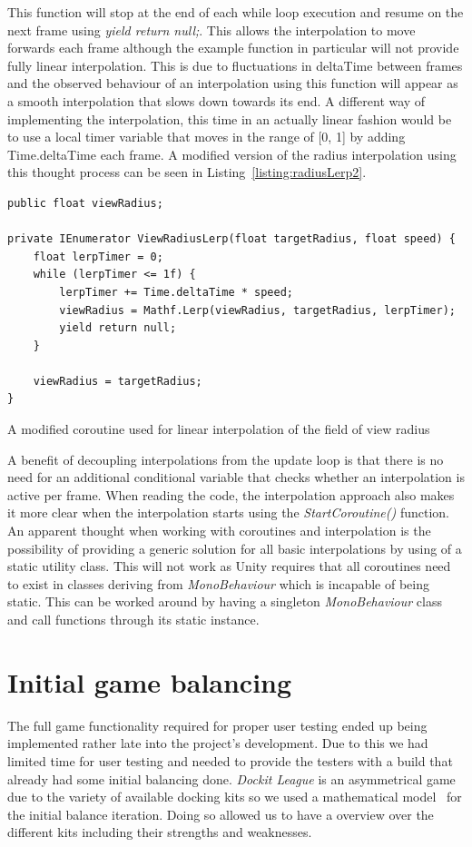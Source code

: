 This function will stop at the end of each while loop execution and resume on the next frame using \emph{yield return null;}. This allows the interpolation to move forwards each frame although the example function in particular will not provide fully linear interpolation. This is due to fluctuations in deltaTime between frames and the observed behaviour of an interpolation using this function will appear as a smooth interpolation that slows down towards its end. A different way of implementing the interpolation, this time in an actually linear fashion would be to use a local timer variable that moves in the range of [0, 1] by adding Time.deltaTime each frame. A modified version of the radius interpolation using this thought process can be seen in Listing~\ref{listing:radiusLerp2}. 

\begin{listing}[htb]
\begin{verbatim}
public float viewRadius;

private IEnumerator ViewRadiusLerp(float targetRadius, float speed) {
    float lerpTimer = 0;
    while (lerpTimer <= 1f) {
        lerpTimer += Time.deltaTime * speed;
        viewRadius = Mathf.Lerp(viewRadius, targetRadius, lerpTimer);
        yield return null;
    }

    viewRadius = targetRadius;
}
\end{verbatim}
\caption[Modified coroutine for linear field of view radius interpolation]{A modified coroutine used for linear interpolation of the field of view radius}
\label{listing:radiusLerp2}
\end{listing}

A benefit of decoupling interpolations from the update loop is that there is no need for an additional conditional variable that checks whether an interpolation is active per frame. When reading the code, the interpolation approach also makes it more clear when the interpolation starts using the \emph{StartCoroutine()} function. 
An apparent thought when working with coroutines and interpolation is the possibility of providing a generic solution for all basic interpolations by using of a static utility class. This will not work as Unity requires that all coroutines need to exist in classes deriving from \emph{MonoBehaviour} which is incapable of being static. This can be worked around by having a singleton \emph{MonoBehaviour} class and call functions through its static instance. 

\section{Initial game balancing}
The full game functionality required for proper user testing ended up being implemented rather late into the project's development. Due to this we had limited time for user testing and needed to provide the testers with a build that already had some initial balancing done. 
\emph{Dockit League} is an asymmetrical game due to the variety of available docking kits so we used a mathematical model~\cite{schell2014art} for the initial balance iteration. Doing so allowed us to have a overview over the different kits including their strengths and weaknesses.

